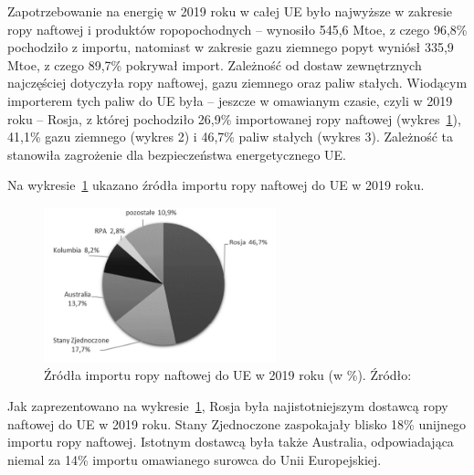 \documentclass[polish, twoside, 12pt, a4paper]{article}
\theoremstyle{definition}
\theoremstyle{plain}
\theoremstyle{remark}
\begin{document}
Zapotrzebowanie na energię w 2019 roku w całej UE było najwyższe w zakresie ropy naftowej i produktów ropopochodnych – wynosiło 545,6 Mtoe, z czego 96,8\% pochodziło z importu, natomiast w zakresie gazu ziemnego popyt wyniósł 335,9 Mtoe, z czego 89,7\% pokrywał import. Zależność od dostaw zewnętrznych najczęściej dotyczyła ropy naftowej, gazu ziemnego oraz paliw stałych. Wiodącym importerem tych paliw do UE była – jeszcze w omawianym czasie, czyli w 2019 roku – Rosja, z której pochodziło 26,9\% importowanej ropy naftowej (wykres~\ref{fig:x1}), 41,1\% gazu ziemnego (wykres 2) i 46,7\% paliw stałych (wykres 3). Zależność ta stanowiła zagrożenie dla bezpieczeństwa energetycznego UE. 

Na wykresie~\ref{fig:x1} ukazano źródła importu ropy naftowej do UE w 2019 roku.

\begin{figure}[hbt]
  \centering
  \includegraphics[width=0.6\textwidth]{./figure_1}
  \caption[Źródła importu ropy naftowej do UE w 2019 roku (w \%)]{Źródła importu ropy naftowej do UE w 2019 roku (w \%). Źródło: \cite{pangsykania2022}}
  \label{fig:x1}
\end{figure}

Jak zaprezentowano na wykresie~\ref{fig:x1}, Rosja była najistotniejszym dostawcą ropy naftowej do UE w 2019 roku. Stany Zjednoczone zaspokajały blisko 18\% unijnego importu ropy naftowej. Istotnym dostawcą była także Australia, odpowiadająca niemal za 14\% importu omawianego surowca do Unii Europejskiej.
\end{document}
